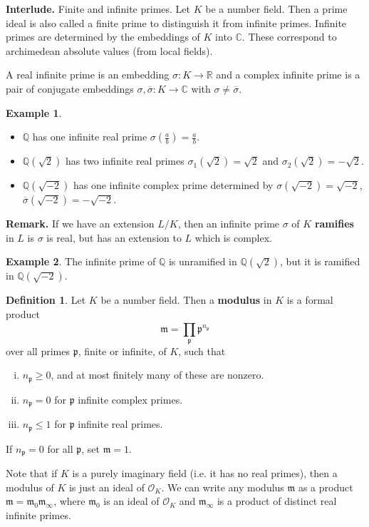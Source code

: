 \documentclass{article}
\theoremstyle{definition}
\newtheorem{example}{Example}[section]
\newtheorem{defn}{Definition}[section]
\begin{document}
\textbf{Interlude.} Finite and infinite primes. Let $K$ be a number field. Then a prime ideal is also called a finite prime to distinguish it from infinite primes. Infinite primes are determined by the embeddings of $K$ into $\mathbb{C}$. These correspond to archimedean absolute values (from local fields).
\vspace{1mm}
 
A real infinite prime is an embedding $\sigma: K \to \mathbb{R}$ and a complex infinite prime is a pair of conjugate embeddings $\sigma, \overline{\sigma}: K \to \mathbb{C}$ with $\sigma \neq \overline{\sigma}$. 
\begin{example}
    \begin{itemize}
        \item $\mathbb{Q}$ has one infinite real prime $\sigma\left(\frac{a}{b}\right) = \frac{a}{b}$.
        \item $\mathbb{Q}(\sqrt{2})$ has two infinite real primes $\sigma_1(\sqrt{2}) =\sqrt{2}$ and $\sigma_2(\sqrt{2}) = -\sqrt{2}$.
        \item $\mathbb{Q}(\sqrt{-2})$ has one infinite complex prime determined by $\sigma(\sqrt{-2})=\sqrt{-2}$, $\overline{\sigma}(\sqrt{-2})=-\sqrt{-2}$.
    \end{itemize}
\end{example}
\textbf{Remark.} If we have an extension $L/K$, then an infinite prime $\sigma$ of $K$ \textbf{ramifies} in $L$ is $\sigma$ is real, but has an extension to $L$ which is complex.
\begin{example}
    The infinite prime of $\mathbb{Q}$ is unramified in $\mathbb{Q}(\sqrt{2})$, but it is ramified in $\mathbb{Q}(\sqrt{-2})$.
\end{example}
\begin{defn}
    Let $K$ be a number field. Then a \textbf{modulus} in $K$ is a formal product \[
        \mathfrak{m} = \prod_{\mathfrak{p}}^{} \mathfrak{p}^{n_{\mathfrak{p}}}
    \]
    over all primes $\mathfrak{p}$, finite or infinite, of $K$, such that
    \begin{enumerate}[(i)]
        \item $n_{\mathfrak{p}}\ge 0$, and at most finitely many of these are nonzero.
        \item $n_{\mathfrak{p}} = 0$ for $\mathfrak{p}$ infinite complex primes.
        \item $n_{\mathfrak{p}} \le 1$ for $\mathfrak{p}$ infinite real primes.
    \end{enumerate}
    If $n_{\mathfrak{p}} = 0$ for all $\mathfrak{p}$, set $\mathfrak{m} = 1$.
\end{defn}
Note that if $K$ is a purely imaginary field (i.e. it has no real primes), then a modulus of $K$ is just an ideal of $\mathcal{O}_K$. We can write any modulus $\mathfrak{m}$ as a product $\mathfrak{m} = \mathfrak{m}_0 \mathfrak{m}_{\infty}$, where $\mathfrak{m}_0$ is an ideal of $\mathcal{O}_K$ and $\mathfrak{m}_{\infty}$ is a product of distinct real infinite primes. 
\end{document}
